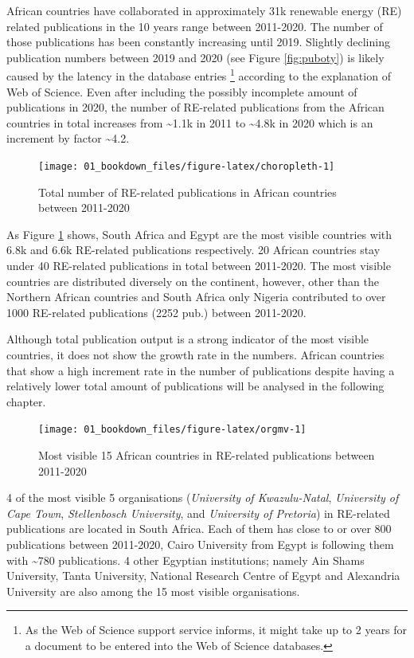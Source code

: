 \documentclass[
]{book}
\begin{document}
African countries have collaborated in approximately 31k renewable energy (RE) related publications in the 10 years range between 2011-2020. The number of those publications has been constantly
increasing until 2019. Slightly declining publication numbers between 2019
and 2020 (see Figure \ref{fig:puboty})
is likely caused by the latency in the database entries \footnote{As the Web of Science support service informs, it might take up to 2 years for a document to be entered into the Web of Science databases.} according to the explanation of Web of Science. Even after including the
possibly incomplete amount of publications in 2020, the number of RE-related publications from
the African countries in total increases from \textasciitilde1.1k in 2011 to \textasciitilde4.8k in
2020 which is an increment by factor \textasciitilde4.2.

\begin{figure}
\texttt{[image: 01\_bookdown\_files/figure-latex/choropleth-1]} \caption{Total number of RE-related publications in African countries between 2011-2020}\label{fig:choropleth}
\end{figure}

As Figure \ref{fig:choropleth} shows, South Africa and Egypt are the most visible countries with 6.8k and 6.6k RE-related publications respectively. 20 African countries stay under 40 RE-related
publications in total between 2011-2020. The most visible countries are distributed diversely on the continent, however, other than the Northern African countries and South Africa only Nigeria contributed to over 1000 RE-related publications (2252 pub.) between 2011-2020.

Although total publication output is a strong indicator of the most visible countries, it does not show the growth rate in the numbers. African countries that show a high increment rate in the number of publications despite having a relatively lower total amount of publications will be analysed in the following chapter.

\begin{figure}
\texttt{[image: 01\_bookdown\_files/figure-latex/orgmv-1]} \caption{Most visible 15 African countries in RE-related publications between 2011-2020}\label{fig:orgmv}
\end{figure}

4 of the most visible 5 organisations (\emph{University of Kwazulu-Natal}, \emph{University of Cape Town}, \emph{Stellenbosch University}, and \emph{University of Pretoria}) in RE-related publications are located in South Africa. Each of them has close to or over 800 publications between 2011-2020, Cairo University from Egypt is following them with \textasciitilde780 publications. 4 other Egyptian institutions; namely Ain Shams University, Tanta University, National Research Centre of Egypt and Alexandria University are also among the 15 most visible organisations.
\end{document}
